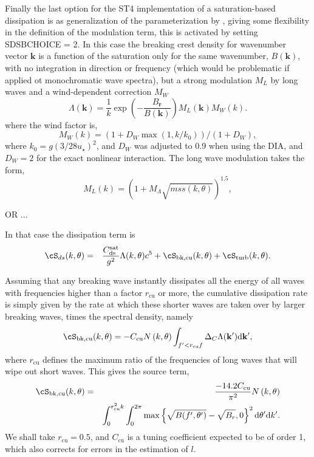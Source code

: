 Finally the last option for the ST4 implementation of a saturation-based dissipation is as generalization 
of the parameterization by \citet{Romero2019}, giving some flexibility in the definition of the modulation 
term, this is activated by setting  {\F  SDSBCHOICE  = 2}. In this case the  breaking crest density for wavenumber vector  
$\mathbf{k}$ is a function of the saturation only for the same wavenumber, $B(\mathbf{k})$, with no integration in direction 
or frequency (which would be problematic if applied ot monochromatic wave spectra), but a strong modulation $M_L$  by long waves
and a wind-dependent correction $M_W$
\begin{equation}
\Lambda (\mathbf{k}) = \frac{1}{k} \exp \left(-\frac{B_{\mathbf{r}}}{B(\mathbf{k})}\right) M_L(\mathbf{k}) M_W(k).
\end{equation}
where the wind factor is, 
\begin{equation}
 M_W(k)=\left( 1+ D_W  \max(1,k/k_0) \right) / (1+D_W),
\end{equation}
where $k_0=g (3/ 28 u_\star)^2$, and $D_W$ was adjusted to 0.9 when using the DIA, and $D_W=2$ for the exact nonlinear interaction.
The long wave modulation takes the form, 
\begin{equation}
 M_L(k)=\left( 1+ M_\Lambda \sqrt{mss(k,\theta)}  \right)^{1.5},
\end{equation}

OR ... 

In that case the dissipation term is 
\begin{eqnarray}
\cS_{ds}(k,\theta)& =&  \frac{C_{\mathrm{ds}}^{\mathrm{sat}} }{g^2} \Lambda (k,\theta) c^5 + \cS_{\mathrm{bk,cu}}(k,\theta) + \cS_{\mathrm{turb}}(k,\theta) \label{Sds_all}.
\end{eqnarray}




Assuming that any breaking
wave instantly dissipates all the energy of all waves with frequencies higher
than a factor $r_{\mathrm{cu}}$ or more, the cumulative dissipation rate is
simply given by the rate at which these shorter waves are taken over by larger
breaking waves, times the spectral density, namely
\begin{equation}
\cS_{\mathrm{bk,cu}}(k,\theta) = -C_{\mathrm{cu}}  N \left(k,\theta\right) \int_{f' < r_{\mathrm{cu}} f } \Delta_C \Lambda(\mathbf{k'}) \mathrm{d\mathbf{k'}},
\label{Sds_cu1}
\end{equation}
where $r_{\mathrm{cu}}$ defines the maximum ratio of the frequencies of long
waves that will wipe out short waves.  This gives the source term,
\begin{eqnarray}
\cS_{\mathrm{bk,cu}}(k,\theta) &=&  \frac{-14.2 C_{\mathrm{cu}}}{\pi^2}  N \left(k,\theta\right)
 \nonumber \\
& &\int_0^{ r^2_{\mathrm{cu}} k }\int_0^{2\pi}
\max \left\{\sqrt{B(f',\theta')}-\sqrt{B_r},0\right\}^2
\mathrm{d}\theta' \mathrm{d}k'.
\label{Sds_sat_isotropic}
\end{eqnarray}
We shall take $r_{\mathrm{cu}}=0.5$, and $C_{\mathrm{cu}}$ is a tuning
coefficient expected to be of order 1, which also corrects for errors in the
estimation of $l$.



